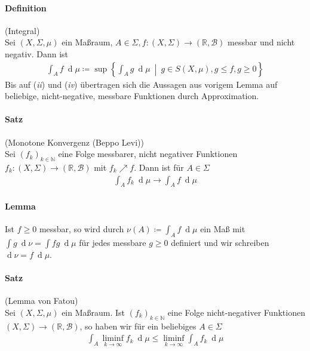 \documentclass[12pt,a4paper,fleqn]{article}
\def\set#1{{\left\{ #1 \right\}}}
\def\Mid{\ \middle|\ }
\def\d{{\operatorname{d}}}
\begin{document}
\paragraph{Definition} (Integral)\\
Sei $(X, \Sigma, \mu)$ ein Maßraum, $A \in \Sigma, f\colon (X, \Sigma) \rightarrow (\mathbb{R}, \mathcal{B})$ messbar und nicht negativ. Dann ist 
\begin{align*}
\int_A f\ \d\mu \coloneqq \sup \set{\int_A g\ \d\mu \Mid g \in S(X, \mu), g \leq f, g \geq 0 }
\end{align*}
Bis auf (\textit{ii}) und (\textit{iv}) übertragen sich die Aussagen aus vorigem Lemma auf beliebige, nicht-negative, messbare Funktionen durch Approximation.

\paragraph{Satz} (Monotone Konvergenz (Beppo Levi))\\
Sei $(f_k)_{k \in \mathbb{N}}$ eine Folge messbarer, nicht negativer Funktionen $f_k: (X, \Sigma) \rightarrow (\mathbb{R}, \mathcal{B})$ mit $f_k \nearrow f$. Dann ist für $A \in \Sigma$
\begin{align*}
\int_A f_k\ \d\mu \rightarrow \int_A f\ \d\mu 
\end{align*}

\paragraph{Lemma} Ist $f \geq 0$ messbar, so wird durch $\nu(A) \coloneqq \int_A f\ \d\mu$ ein Maß mit\linebreak ${\int g\ \d\nu = \int fg\ \d\mu}$ für jedes messbare $g \geq 0$ definiert und wir schreiben $\d\nu = f\ \d\mu$.

\paragraph{Satz} (Lemma von Fatou)\\
Sei $(X, \Sigma, \mu)$ ein Maßraum. Ist $(f_k)_{k \in \mathbb{N}}$ eine Folge nicht-negativer Funktionen\linebreak ${(X, \Sigma) \rightarrow (\mathbb{R}, \mathcal{B})}$, so haben wir für ein beliebiges $A \in \Sigma$
\begin{align*}
\int_A \liminf_{k \rightarrow \infty} f_k\ \d\mu \leq \liminf_{k \rightarrow \infty} \int_A f_k\ \d\mu 
\end{align*}
\end{document}
